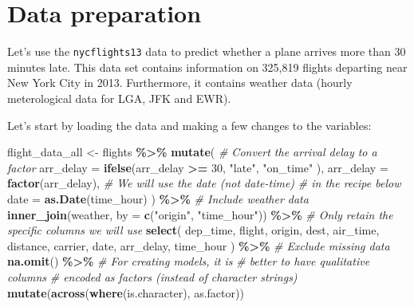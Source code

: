 \documentclass[
]{book}
\newenvironment{Shaded}{\begin{snugshade}}{\end{snugshade}}
\newcommand{\CommentTok}[1]{\textcolor[rgb]{0.56,0.35,0.01}{\textit{#1}}}
\newcommand{\DataTypeTok}[1]{\textcolor[rgb]{0.13,0.29,0.53}{#1}}
\newcommand{\DecValTok}[1]{\textcolor[rgb]{0.00,0.00,0.81}{#1}}
\newcommand{\KeywordTok}[1]{\textcolor[rgb]{0.13,0.29,0.53}{\textbf{#1}}}
\newcommand{\NormalTok}[1]{#1}
\newcommand{\OperatorTok}[1]{\textcolor[rgb]{0.81,0.36,0.00}{\textbf{#1}}}
\newcommand{\StringTok}[1]{\textcolor[rgb]{0.31,0.60,0.02}{#1}}
\begin{document}
\hypertarget{data-preparation-1}{%
\chapter{Data preparation}\label{data-preparation-1}}

Let's use the \texttt{nycflights13} data to predict whether a plane arrives more than 30 minutes late. This data set contains information on 325,819 flights departing near New York City in 2013. Furthermore, it contains weather data (hourly meterological data for LGA, JFK and EWR).

Let's start by loading the data and making a few changes to the variables:

\begin{Shaded}
\begin{Highlighting}[]
\NormalTok{flight\_data\_all \textless{}{-}}
\StringTok{  }\NormalTok{flights }\OperatorTok{\%\textgreater{}\%}
\StringTok{  }\KeywordTok{mutate}\NormalTok{(}
    \CommentTok{\# Convert the arrival delay to a factor}
    \DataTypeTok{arr\_delay =} \KeywordTok{ifelse}\NormalTok{(arr\_delay }\OperatorTok{\textgreater{}=}\StringTok{ }\DecValTok{30}\NormalTok{,}
      \StringTok{"late"}\NormalTok{,}
      \StringTok{"on\_time"}
\NormalTok{    ),}
    \DataTypeTok{arr\_delay =} \KeywordTok{factor}\NormalTok{(arr\_delay),}
    \CommentTok{\# We will use the date (not date{-}time)}
    \CommentTok{\# in the recipe below}
    \DataTypeTok{date =} \KeywordTok{as.Date}\NormalTok{(time\_hour)}
\NormalTok{  ) }\OperatorTok{\%\textgreater{}\%}
\StringTok{  }\CommentTok{\# Include  weather data}
\StringTok{  }\KeywordTok{inner\_join}\NormalTok{(weather, }\DataTypeTok{by =} \KeywordTok{c}\NormalTok{(}\StringTok{"origin"}\NormalTok{, }\StringTok{"time\_hour"}\NormalTok{)) }\OperatorTok{\%\textgreater{}\%}
\StringTok{  }\CommentTok{\# Only retain the specific columns we will use}
\StringTok{  }\KeywordTok{select}\NormalTok{(}
\NormalTok{    dep\_time, flight, origin,}
\NormalTok{    dest, air\_time, distance,}
\NormalTok{    carrier, date, arr\_delay, time\_hour}
\NormalTok{  ) }\OperatorTok{\%\textgreater{}\%}
\StringTok{  }\CommentTok{\# Exclude missing data}
\StringTok{  }\KeywordTok{na.omit}\NormalTok{() }\OperatorTok{\%\textgreater{}\%}
\StringTok{  }\CommentTok{\# For creating models, it is}
\StringTok{  }\CommentTok{\# better to have qualitative columns}
\StringTok{  }\CommentTok{\# encoded as factors (instead of character strings)}
\StringTok{  }\KeywordTok{mutate}\NormalTok{(}\KeywordTok{across}\NormalTok{(}\KeywordTok{where}\NormalTok{(is.character), as.factor))}
\end{Highlighting}
\end{Shaded}
\end{document}
